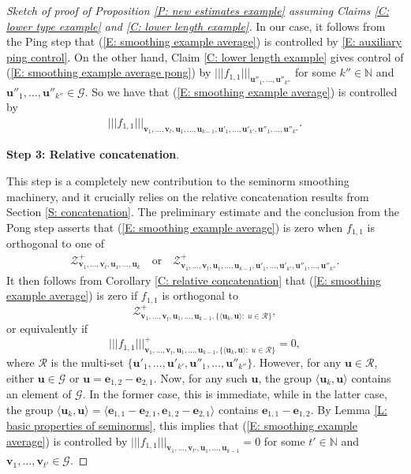 \documentclass[11pt]{amsart}
\theoremstyle{definition}
\newcommand{\N}{{\mathbb N}}
\newcommand{\CG}{{\mathcal G}}
\newcommand{\be}{{\mathbf{e}}}
\newcommand{\bu}{{\mathbf{u}}}
\newcommand{\bv}{{\mathbf{v}}}
\newcommand{\nnorm}[1]{\lvert\!|\!| #1|\!|\!\rvert}
\newcommand{\1}{{\mathbf{1}}}
\begin{document}
\begin{proof}[Sketch of proof of Proposition \ref{P: new estimates example} assuming Claims \ref{C: lower type example} and \ref{C: lower length example}]
In our case, it follows from the Ping step that (\ref{E: smoothing example average}) is controlled by \eqref{E: auxiliary ping control}. %
On the other hand, Claim \ref{C: lower length example} gives control of (\ref{E: smoothing example average pong}) by $\nnorm{f_{1,1}}_{\bu''_{1},\dots,\bu''_{k''}}$ for some $k''\in\N$ and $\bu''_{1},\dots,\bu''_{k''}\in \mathcal{G}$. So we have that (\ref{E: smoothing example average}) is controlled by 
\begin{align}\label{E: auxiliary pong control}
    \nnorm{f_{1,1}}_{\bv_{1},\dots,\bv_{t},\bu_{1},\dots,\bu_{k-1},\bu'_{1},\dots,\bu'_{k'},\bu''_{1},\dots,\bu''_{k''}}.
\end{align}

 \smallskip
\textbf{Step 3: Relative concatenation}.
 \smallskip

This step is a completely new contribution to the seminorm smoothing machinery, and it crucially relies on the relative concatenation results from Section \ref{S: concatenation}. The preliminary estimate and the conclusion from the Pong step asserts that (\ref{E: smoothing example average}) is zero when $f_{1,1}$ is orthogonal to one of
\begin{align*}
    \mathcal{Z}^+_{\bv_{1},\dots,\bv_{t},\bu_{1},\dots,\bu_k}\quad \textrm{or}\quad  \mathcal{Z}^+_{\bv_{1},\dots,\bv_{t},\bu_{1},\dots,\bu_{k-1},\bu'_{1},\dots,\bu'_{k'},\bu''_{1},\dots,\bu''_{k''}}. 
\end{align*}
It then follows from Corollary \ref{C: relative concatenation} that (\ref{E: smoothing example average}) is zero if $f_{1,1}$ is orthogonal to $$\mathcal{Z}^+_{\bv_{1},\dots,\bv_{t},\bu_{1},\dots,\bu_{k-1},\{\langle \bu_k,\bu \rangle:\; u\in\mathcal{R}\}},$$ or equivalently if $$\nnorm{f_{1,1}}^+_{\bv_{1},\dots,\bv_{t},\bu_{1},\dots,\bu_{k-1}, \{\langle \bu_k,\bu \rangle:\; u\in\mathcal{R}\}}=0,$$ where $\mathcal{R}$ is the multi-set $\{\bu'_{1},\dots,\bu'_{k'},\bu''_{1},\dots,\bu''_{k''}\}$.
However, for any $\bu\in\mathcal{R}$,  either $\bu\in\mathcal{G}$ or $\bu=\be_{1,2}-\be_{2,1}$. Now, for any such $\bu$, the group $\langle \bu_k,\bu \rangle$ contains an element of $\CG$. In the former case, this is immediate, while in the latter case, the group $\langle \bu_k,\bu \rangle=\langle \be_{1,1}-\be_{2,1}, \be_{1,2}-\be_{2,1} \rangle$ contains $\be_{1,1}-\be_{1,2}$. By Lemma \ref{L: basic properties of seminorms}, this implies that  (\ref{E: smoothing example average}) is controlled by $\nnorm{f_{1,1}}_{\bv_{1},\dots,\bv_{t'},\bu_{1},\dots,\bu_{k-1}}=0$ for some $t'\in\N$ and $\bv_{1},\dots,\bv_{t'}\in\mathcal{G}$.


\end{proof}
\end{document}
